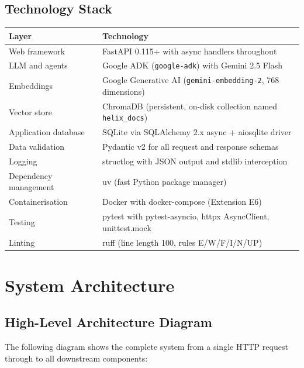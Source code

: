 \documentclass[12pt,a4paper]{article}
\begin{document}
\subsection{Technology Stack}

\begin{center}
\begin{tabularx}{\textwidth}{lX}
\toprule
\textbf{Layer} & \textbf{Technology} \\
\midrule
Web framework & FastAPI 0.115+ with async handlers throughout \\
LLM and agents & Google ADK (\texttt{google-adk}) with Gemini 2.5 Flash \\
Embeddings & Google Generative AI (\texttt{gemini-embedding-2}, 768 dimensions) \\
Vector store & ChromaDB (persistent, on-disk collection named \texttt{helix\_docs}) \\
Application database & SQLite via SQLAlchemy 2.x async + aiosqlite driver \\
Data validation & Pydantic v2 for all request and response schemas \\
Logging & structlog with JSON output and stdlib interception \\
Dependency management & uv (fast Python package manager) \\
Containerisation & Docker with docker-compose (Extension E6) \\
Testing & pytest with pytest-asyncio, httpx AsyncClient, unittest.mock \\
Linting & ruff (line length 100, rules E/W/F/I/N/UP) \\
\bottomrule
\end{tabularx}
\end{center}



\section{System Architecture}

\subsection{High-Level Architecture Diagram}

The following diagram shows the complete system from a single HTTP request through to all downstream components:
\end{document}
